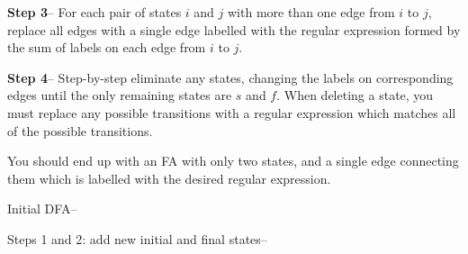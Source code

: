 \textbf{Step 3}-- For each pair of states $i$ and $j$ with more than one edge from $i$ to $j$, replace all edges with a
 single edge labelled with the regular expression formed by the sum of labels on each edge from $i$ to $j$.

\textbf{Step 4}-- Step-by-step eliminate any states, changing the labels on corresponding edges until the only remaining
 states are $s$ and $f$. When deleting a state, you must replace any possible transitions with a regular expression
 which matches all of the possible transitions.

You should end up with an FA with only two states, and a single edge connecting them which is labelled with the desired
 regular expression.

\begin{example*}{}{}
  Initial DFA--
  \begin{center}
  \end{center}

  Steps 1 and 2: add new initial and final states--
  \begin{center}
\end{center}
\end{example*}
